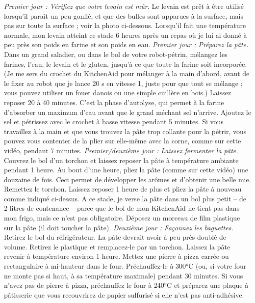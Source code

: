\ingredient{}\textit{Premier jour : Vérifiez que votre levain est mûr.}
\ingredient{}Le levain est prêt à être utilisé lorsqu'il paraît un peu gonflé, et que des bulles sont apparues à la surface, mais pas sur toute la surface ; voir la photo ci-dessous. Lorsqu'il fait une température normale, mon levain atteint ce stade 6 heures après un repas où je lui ai donné à peu près son poids en farine et son poids en eau.
\ingredient{}
\ingredient{}\textit{Premier jour : Préparez la pâte.}
Dans un grand saladier, ou dans le bol de votre robot-pétrin, mélangez les farines, l'eau, le levain et le gluten, jusqu'à ce que toute la farine soit incorporée. (Je me sers du crochet du KitchenAid pour mélanger à la main d'abord, avant de le fixer au robot que je lance 20 s en vitesse 1, juste pour que tout se mélange ; vous pouvez utiliser un fouet danois ou une simple cuillère en bois.)
\ingredient{}Laissez reposer 20 à 40 minutes. C'est la phase d'autolyse, qui permet à la farine d'absorber un maximum d'eau avant que le grand méchant sel n'arrive.
Ajoutez le sel et pétrissez avec le crochet à basse vitesse pendant 5 minutes. Si vous travaillez à la main et que vous trouvez la pâte trop collante pour la pétrir, vous pouvez vous contenter de la plier sur elle-même avec la corne, comme sur cette vidéo, pendant 7 minutes.
\ingredient{}
\ingredient{}\textit{Premier/deuxième jour : Laissez fermenter la pâte.}
\ingredient{}Couvrez le bol d'un torchon et laissez reposer la pâte à température ambiante pendant 1 heure. Au bout d'une heure, pliez la pâte (comme sur cette vidéo) une douzaine de fois. Ceci permet de développer les arômes et d'obtenir une belle mie. Remettez le torchon.
\ingredient{}Laissez reposer 1 heure de plus et pliez la pâte à nouveau comme indiqué ci-dessus.
\ingredient{}A ce stade, je verse la pâte dans un bol plus petit -- de 2 litres de contenance -- parce que le bol de mon KitchenAid ne tient pas dans mon frigo, mais ce n'est pas obligatoire.
\ingredient{}Déposez un morceau de film plastique sur la pâte (il doit toucher la pâte).
\ingredient{}
\ingredient{}\textit{Deuxième jour : Façonnez les baguettes.}
\ingredient{}Retirez le bol du réfrigérateur. La pâte devrait avoir à peu près doublé de volume.
\ingredient{}Retirez le plastique et remplacez-le par un torchon. Laissez la pâte revenir à température environ 1 heure.
\ingredient{}Mettez une pierre à pizza carrée ou rectangulaire à mi-hauteur dans le four. Préchauffez-le à 300°C (ou, si votre four ne monte pas si haut, à sa température maximale) pendant 30 minutes. Si vous n'avez pas de pierre à pizza, préchauffez le four à 240°C et préparez une plaque à pâtisserie que vous recouvrirez de papier sulfurisé si elle n'est pas anti-adhésive.
